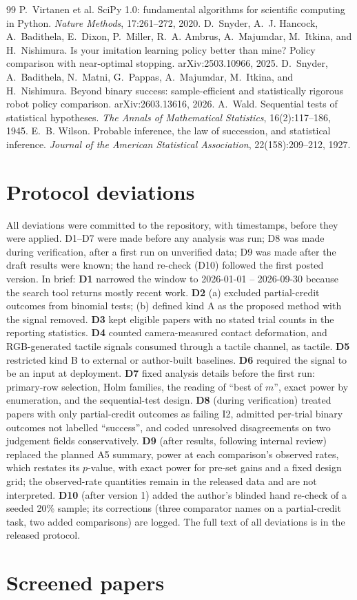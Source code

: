 \documentclass[11pt]{article}
\begin{document}
\begin{thebibliography}{99}
 P.~Virtanen et al. SciPy 1.0: fundamental algorithms for scientific computing in Python. \emph{Nature Methods}, 17:261--272, 2020.
 D.~Snyder, A.~J. Hancock, A.~Badithela, E.~Dixon, P.~Miller, R.~A. Ambrus, A.~Majumdar, M.~Itkina, and H.~Nishimura. Is your imitation learning policy better than mine? Policy comparison with near-optimal stopping. arXiv:2503.10966, 2025.
 D.~Snyder, A.~Badithela, N.~Matni, G.~Pappas, A.~Majumdar, M.~Itkina, and H.~Nishimura. Beyond binary success: sample-efficient and statistically rigorous robot policy comparison. arXiv:2603.13616, 2026.
 A.~Wald. Sequential tests of statistical hypotheses. \emph{The Annals of Mathematical Statistics}, 16(2):117--186, 1945.
 E.~B. Wilson. Probable inference, the law of succession, and statistical inference. \emph{Journal of the American Statistical Association}, 22(158):209--212, 1927.
\end{thebibliography}

\appendix
\section{Protocol deviations}\label{app:deviations}
All deviations were committed to the repository, with timestamps, before they were applied. D1--D7 were made before any analysis was run; D8 was made during verification, after a first run on unverified data; D9 was made after the draft results were known; the hand re-check (D10) followed the first posted version. In brief:
\textbf{D1} narrowed the window to 2026-01-01 -- 2026-09-30 because the search tool returns mostly recent work.
\textbf{D2} (a) excluded partial-credit outcomes from binomial tests; (b) defined kind A as the proposed method with the signal removed.
\textbf{D3} kept eligible papers with no stated trial counts in the reporting statistics.
\textbf{D4} counted camera-measured contact deformation, and RGB-generated tactile signals consumed through a tactile channel, as tactile.
\textbf{D5} restricted kind B to external or author-built baselines.
\textbf{D6} required the signal to be an input at deployment.
\textbf{D7} fixed analysis details before the first run: primary-row selection, Holm families, the reading of ``best of $m$'', exact power by enumeration, and the sequential-test design.
\textbf{D8} (during verification) treated papers with only partial-credit outcomes as failing I2, admitted per-trial binary outcomes not labelled ``success'', and coded unresolved disagreements on two judgement fields conservatively. \textbf{D9} (after results, following internal review) replaced the planned A5 summary, power at each comparison's observed rates, which restates its $p$-value, with exact power for pre-set gains and a fixed design grid; the observed-rate quantities remain in the released data and are not interpreted. \textbf{D10} (after version 1) added the author's blinded hand re-check of a seeded 20\% sample; its corrections (three comparator names on a partial-credit task, two added comparisons) are logged. The full text of all deviations is in the released protocol.

\section{Screened papers}

\end{document}
